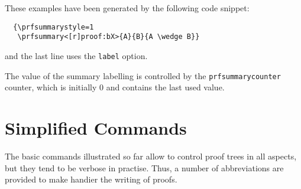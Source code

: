 \documentclass{amsart}
\begin{document}
These examples have been generated by the following code snippet:
\begin{verbatim}
  {\prfsummarystyle=1
   \prfsummary<[r]proof:bX>{A}{B}{A \wedge B}}
\end{verbatim}
and the last line uses the \verb|label| option.\vspace{2ex}

The value of the summary labelling is controlled by the
\verb|prfsummarycounter| counter, which is initially $0$ and contains
the last used value.

\clearpage
\section{Simplified Commands}\label{sec:simplified_commands}
The basic commands illustrated so far allow to control proof trees in
all aspects, but they tend to be verbose in practise. Thus, a number
of abbreviations are provided to make handier the writing of proofs.
\end{document}
